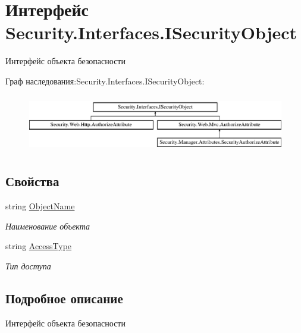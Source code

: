 \hypertarget{interface_security_1_1_interfaces_1_1_i_security_object}{}\section{Интерфейс Security.\+Interfaces.\+I\+Security\+Object}
\label{interface_security_1_1_interfaces_1_1_i_security_object}


Интерфейс объекта безопасности  


Граф наследования\+:Security.\+Interfaces.\+I\+Security\+Object\+:\begin{figure}[H]
\begin{center}
\leavevmode
\includegraphics[height=2.537765cm]{de/d45/interface_security_1_1_interfaces_1_1_i_security_object}
\end{center}
\end{figure}
\subsection*{Свойства}
\begin{DoxyCompactItemize}
\item 
string \hyperlink{interface_security_1_1_interfaces_1_1_i_security_object_ae035c149d2c91a79563bc3698a871295}{Object\+Name}
\begin{DoxyCompactList}\small\item\em Наименование объекта \end{DoxyCompactList}\item 
string \hyperlink{interface_security_1_1_interfaces_1_1_i_security_object_a4c0fec65df409277ce348f948d214260}{Access\+Type}
\begin{DoxyCompactList}\small\item\em Тип доступа \end{DoxyCompactList}\end{DoxyCompactItemize}


\subsection{Подробное описание}
Интерфейс объекта безопасности 



